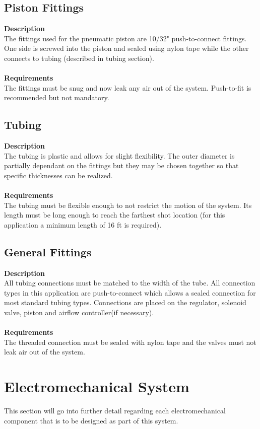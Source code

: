 \documentclass[titlepage]{article}
\begin{document}
\subsection{Piston Fittings}
\textbf{Description}\\
The fittings used for the pneumatic piston are 10/32" push-to-connect fittings. One side is screwed into the piston and sealed using nylon tape while the other connects to tubing (described in tubing section). \\~\\
\textbf{Requirements}\\
The fittings must be snug and now leak any air out of the system. Push-to-fit is recommended but not mandatory. 

\subsection{Tubing}
\textbf{Description}\\
The tubing is plastic and allows for slight flexibility. The outer diameter is partially dependant on the fittings but they may be chosen together so that specific thicknesses can be realized.\\~\\
\textbf{Requirements}\\
The tubing must be flexible enough to not restrict the motion of the system. Its length must be long enough to reach the farthest shot location (for this application a minimum length of 16 ft is required).

\subsection{General Fittings}
\textbf{Description}\\
All tubing connections must be matched to the width of the tube. All connection types in this application are push-to-connect which allows a sealed connection for most standard tubing types. Connections are placed on the regulator, solenoid valve, piston and airflow controller(if necessary).\\~\\
\textbf{Requirements}\\
The threaded connection must be sealed with nylon tape and the valves must not leak air out of the system.



\section{Electromechanical System}
This section will go into further detail regarding each electromechanical component that is to be designed as part of this system.
\end{document}
